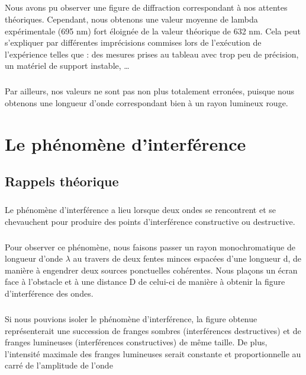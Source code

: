 \documentclass[11pt,a4paper]{report}
\begin{document}
	\paragraph{}
	Nous avons pu observer une figure de diffraction correspondant à nos attentes théoriques. Cependant, nous obtenons une valeur moyenne de lambda expérimentale (695 nm) fort éloignée de la valeur théorique de 632 nm. Cela peut s'expliquer par différentes imprécisions commises lors de l'exécution de l'expérience telles que : des mesures prises au tableau avec trop peu de précision, un matériel de support instable, … 
	\paragraph{}
Par ailleurs, nos valeurs ne sont pas non plus totalement erronées, puisque nous obtenons une longueur d'onde correspondant bien à un rayon lumineux rouge.
\chapter{Le phénomène d'interférence}
	\section{Rappels théorique}
\paragraph{}	
Le phénomène d'interférence a lieu lorsque deux ondes se rencontrent et se chevauchent pour produire des points d'interférence constructive ou destructive.
\paragraph{}
Pour observer ce phénomène, nous faisons passer un rayon monochromatique de longueur d'onde $\lambda$ au travers de deux fentes minces espacées d'une longueur d, de manière à engendrer deux sources ponctuelles cohérentes. Nous plaçons un écran face à l'obstacle et à une distance D de celui-ci de manière à obtenir la figure d'interférence des ondes. 
\paragraph{}
Si nous pouvions isoler le phénomène d'interférence, la figure obtenue représenterait une succession de franges sombres (interférences destructives) et de franges lumineuses (interférences constructives) de même taille. De plus, l'intensité maximale des franges lumineuses serait constante et proportionnelle au carré de l'amplitude de l'onde 
\end{document}
